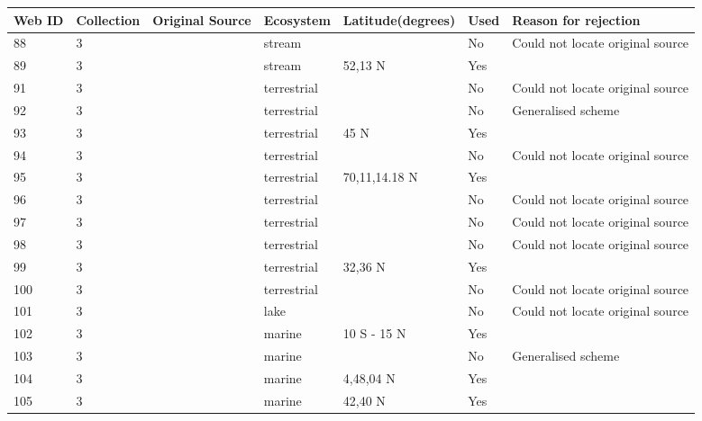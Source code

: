 \documentclass[12pt]{article}
\begin{document}
\begin{landscape}
    \begin{table}[h!]
    \centering
    {\footnotesize
      \begin{tabular}{p{2.8cm}p{1.3cm}p{5.5cm}p{2.2cm}p{2.5cm}lp{3.5cm}}
        \hline
        Web ID & Collection & Original Source & Ecosystem & Latitude(degrees) & Used  & Reason for rejection  \\
        \hline
        88    & 3 & \cite{Kuusela1980}  & stream &       & No    & Could not locate original source \\
        89    & 3 & \cite{Hartley1948}  & stream & 52,13 N & Yes   &       \\
        91    & 3 & \cite{Cohen1990}  & terrestrial &       & No    & Could not locate original source \\
        92    & 3 & \cite{Swan1961}  & terrestrial &       & No    & Generalised scheme \\
        93    & 3 & \cite{Pattie1966}    & terrestrial & 45 N  & Yes   &       \\
        94    & 3 & \cite{Brown1971}    & terrestrial &       & No    & Could not locate original source \\
        95    & 3 & \cite{Brown1975}    & terrestrial & 70,11,14.18 N & Yes   &       \\
        96    & 3 & \cite{Cohen1990}  & terrestrial &       & No    & Could not locate original source \\
        97    & 3 & \cite{Cohen1990}  & terrestrial &       & No    & Could not locate original source \\
        98    & 3 & \cite{Holm1980}  & terrestrial &       & No    & Could not locate original source \\
        99    & 3 & \cite{Howes1954}    & terrestrial & 32,36 N & Yes   &       \\
        100   & 3 & \cite{Cohen1990}  & terrestrial &       & No    & Could not locate original source \\
        101   & 3 & \cite{Cohen1990} & lake  &       & No    & Could not locate original source \\
        102   & 3 & \cite{Shushkina1979}  & marine & 10 S - 15 N & Yes   &       \\
        103   & 3 & \cite{Petipa1979}  & marine &       & No    & Generalised scheme \\
        104   & 3 & \cite{Menge1976}  & marine & 4,48,04 N & Yes   &       \\
        105   & 3 & \cite{Edwards1982}  & marine & 42,40 N & Yes   &       \\

\end{tabular}}
\end{table}
\end{landscape}
\end{document}
